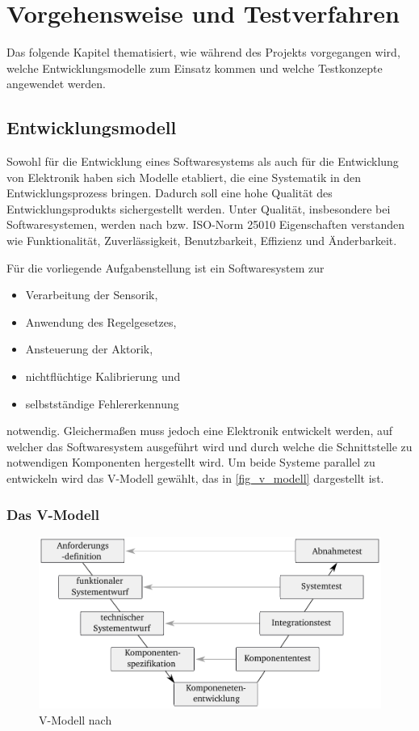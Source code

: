 \chapter{Vorgehensweise und Testverfahren}\label{kap3}
Das folgende Kapitel thematisiert, wie während des Projekts vorgegangen wird, welche Entwicklungsmodelle zum Einsatz kommen und welche Testkonzepte angewendet werden.

\section{Entwicklungsmodell}
Sowohl für die Entwicklung eines Softwaresystems als auch für die Entwicklung von Elektronik haben sich Modelle etabliert, die eine Systematik in den Entwicklungsprozess bringen. Dadurch soll eine hohe Qualität des Entwicklungsprodukts sichergestellt werden. 
Unter Qualität, insbesondere bei Softwaresystemen, werden nach \cite{BasSof} bzw. ISO-Norm 25010 \cite{ISO_25010} Eigenschaften verstanden wie Funktionalität, Zuverlässigkeit, Benutzbarkeit, Effizienz und Änderbarkeit.

Für die vorliegende Aufgabenstellung ist ein Softwaresystem zur
\begin{itemize}
	\item Verarbeitung der Sensorik,
	\item Anwendung des Regelgesetzes,
	\item Ansteuerung der Aktorik,
	\item nichtflüchtige Kalibrierung und
	\item selbstständige Fehlererkennung
\end{itemize}
notwendig. Gleichermaßen muss jedoch eine Elektronik entwickelt werden, auf welcher das Softwaresystem ausgeführt wird und durch welche die Schnittstelle zu notwendigen Komponenten hergestellt wird. Um beide Systeme parallel zu entwickeln wird das V-Modell gewählt, das in \autoref{fig_v_modell} dargestellt ist. 



\subsection{Das V-Modell}

\begin{figure}%
\includegraphics[width=\columnwidth]{./Bilder/fig_v_modell}%
\caption{V-Modell nach \cite{Boehm79}}%
\label{fig_v_modell}%
\end{figure}

